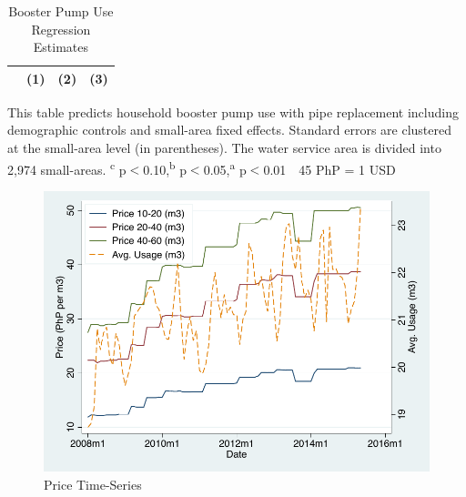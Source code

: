 \documentclass[12pt,table]{article}
\newcommand{\regtext}{
Standard errors are clustered at the small-area level (in parentheses).  The water service area is divided into 2,974 small-areas.
\textsuperscript{c} p$<$0.10,\textsuperscript{b} p$<$0.05,\textsuperscript{a} p$<$0.01 \,\,
}
\begin{document}
\begin{table}[h!] 
\centering
\caption{Booster Pump Use Regression Estimates}\label{table:boosterregs}
\vspace{-2mm}
\begin{threeparttable}
\begin{tabular}{@{}l*{1}{ccc}@{}}
\toprule
  & (1) & (2) & (3)  \\
\midrule

\bottomrule
\end{tabular}
\begin{tablenotes}
\footnotesize
\item This table predicts household booster pump use with pipe replacement including demographic controls and small-area fixed effects.   \regtext 45 PhP = 1 USD \,\,
\end{tablenotes}
\end{threeparttable}
\end{table}







\begin{figure}
\caption{Price Time-Series}\label{figure:pricetimeseries}
\begin{center}
\includegraphics[scale=1]{tables/price_series.pdf}
\end{center}
\end{figure}
\end{document}
